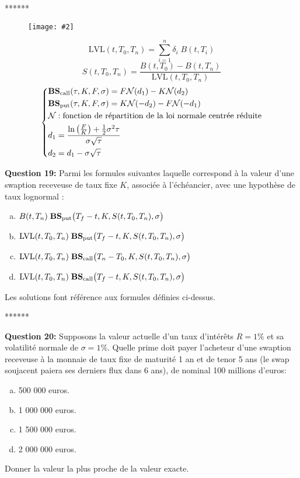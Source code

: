 \documentclass{article}
\newcommand{\FIG}[2]{\texttt{[image: \#2]}}
\newcommand{\indentitem}{\setlength\itemindent{25pt}}
\begin{document}
\newpage
\smallskip
\centerline{******}
\smallskip
\begin{figure}[H]
\FIG{15cm}{figures/schema_swaption.jpg}
\end{figure}
\[
\text{LVL}(t,T_0,T_n)=\sum_{i=1}^{n}\delta_i \;B(t,T_i)
\]
\[
S(t,T_0,T_n)= \frac{B(t,T_0)-B(t,T_n)}{\text{LVL}(t,T_0,T_n)}
\]
\[
\left\{
\begin{split}
&\text{\textbf{BS}}_\text{call}(\tau,K,F,\sigma)=F\mathcal{N}(d_1)-K \mathcal{N}(d_2)\\
&\text{\textbf{BS}}_\text{put}(\tau,K,F,\sigma)=K\mathcal{N}(-d_2)-F \mathcal{N}(-d_1)\\
&\mathcal{N} : \text{fonction de répartition de la loi normale centrée réduite}\\
&d_1=\frac{\ln\left(\frac{F}{K}\right)+\frac{1}{2}\sigma^2\tau}{\sigma\sqrt{\tau}}\\
&d_2=d_1-\sigma\sqrt{\tau}
\end{split}
\right.
\]

\textbf{Question 19:}
Parmi les formules suivantes laquelle correspond à la valeur d’une swaption receveuse de taux fixe $K$, associée à l’échéancier,  avec une hypothèse de taux lognormal :
\begin{enumerate}[a)]
\indentitem \item $B(t,T_n) \;\text{\textbf{BS}}_\text{put}\big(T_f-t,K,S(t,T_{0},T_n),\sigma\big)$
\indentitem \item $\text{LVL}(t,T_0,T_n) \;\text{\textbf{BS}}_\text{put}\big(T_f-t,K,S(t,T_{0},T_n),\sigma\big)$
\indentitem \item $\text{LVL}(t,T_0,T_n) \;\text{\textbf{BS}}_\text{call}\big(T_n-T_0,K,S(t,T_{0},T_n),\sigma\big)$
\indentitem \item $\text{LVL}(t,T_0,T_n) \;\text{\textbf{BS}}_\text{call}\big(T_f-t,K,S(t,T_{0},T_n),\sigma\big)$
\end{enumerate}
Les solutions font référence aux formules définies ci-dessus.
\newpage
\smallskip
\centerline{******}
\smallskip
\textbf{Question 20:} 
Supposons la valeur actuelle d'un taux d'intérêts $R=1\%$ et sa volatilité normale de $\sigma=1\%$. Quelle prime doit payer l'acheteur d'une swaption receveuse à la monnaie de taux fixe de maturité 1 an et de tenor 5 ans (le swap soujacent paiera ses derniers flux dans 6 ans), de nominal 100 millions d'euros:
\begin{enumerate}[a)]
\indentitem \item 500 000 euros.
\indentitem \item 1 000 000 euros.
\indentitem \item 1 500 000 euros.
\indentitem \item 2 000 000 euros.
\end{enumerate}
Donner la valeur la plus proche de la valeur exacte.
\end{document}
